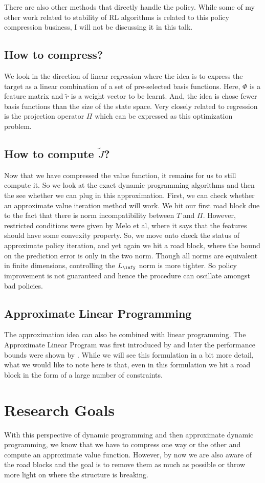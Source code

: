 \documentclass{article}
\newcommand{\tj}{\tilde{J}}
\begin{document}
There are also other methods that directly handle the policy. While some of my other work related to stability of RL algorithms is related to this policy compression business, I will not be discussing it in this talk.
\subsection{How to compress?}
We look in the direction of linear regression where the idea is to express the target as a linear combination of a set of pre-selected basis functions. Here, $\Phi$ is a feature matrix and $\tilde{r}$ is a weight vector to be learnt. And, the idea is chose fewer basis functions than the size of the state space. Very closely related to regression is the projection operator $\Pi$ which can be expressed as this optimization problem.
\subsection{How to compute $\tj$?}
Now that we have compressed the value function, it remains for us to still compute it. So we look at the exact dynamic programming algorithms and then the see whether we can plug in this approximation. First, we can check whether an approximate value iteration method will work. We hit our first road block due to the fact that there is norm incompatibility between $T$ and $\Pi$. However, restricted conditions were given by Melo et al, where it says that the features should have some convexity property. So, we move onto check the status of approximate policy iteration, and yet again we hit a road block, where the bound on the prediction error is only in the two norm. Though all norms are equivalent in finite dimensions, controlling the $L_\infy$ norm is more tighter. So policy improvement is not guaranteed and hence the procedure can oscillate amongst bad policies.
\subsection{Approximate Linear Programming}
The approximation idea can also be combined with linear programming. The Approximate Linear Program was first introduced by \cite{schweitzer1985generalized} and later the performance bounds were shown by \cite{de2003linear}. While we will see this formulation in a bit more detail, what we would like to note here is that, even in this formulation we hit a road block in the form of a large number of constraints.
\section{Research Goals}
With this perspective of dynamic programming and then approximate dynamic programming, we know that we have to compress one way or the other and compute an approximate value function. However, by now we are also aware of the road blocks and the goal is to remove them as much as possible or throw more light on where the structure is breaking.
\end{document}
